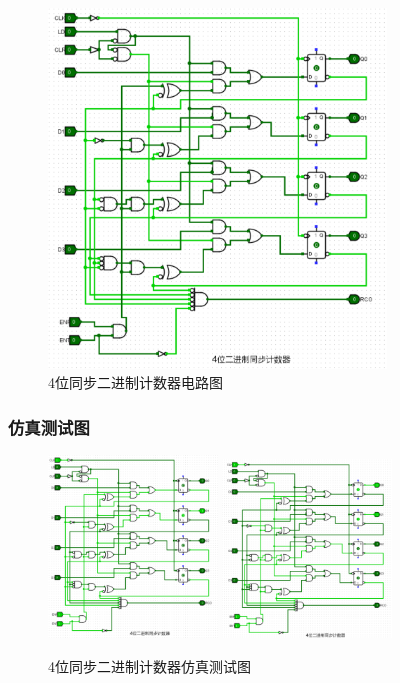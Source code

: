 \documentclass{article}
\begin{document}
    \begin{figure}[H]
    \centering
    \includegraphics[width=0.8\textwidth]{1.4.2.png}
    \caption{4位同步二进制计数器电路图}
    \end{figure}

    \subsubsection{仿真测试图}
    \begin{figure}[H]
    \centering
    \includegraphics[width=0.4\textwidth]{1.5.1.png}
    \includegraphics[width=0.4\textwidth]{1.5.2.png}
    
    \caption{4位同步二进制计数器仿真测试图}
    \end{figure}
\end{document}
